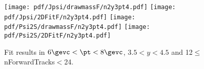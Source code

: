 \begin{figure}[H]
\begin{center}
\texttt{[image: pdf/Jpsi/drawmassF/n2y3pt4.pdf]}
\texttt{[image: pdf/Jpsi/2DFitF/n2y3pt4.pdf]}
\vspace*{-0.5cm}
\texttt{[image: pdf/Psi2S/drawmassF/n2y3pt4.pdf]}
\texttt{[image: pdf/Psi2S/2DFitF/n2y3pt4.pdf]}
\vspace*{-0.5cm}
\end{center}
\caption{Fit results in $6\gevc<\pt<8\gevc$, $3.5<y<4.5$ and 12$\leq$nForwardTracks$<$24.}
\label{Fitn2y3pt4}
\end{figure}
